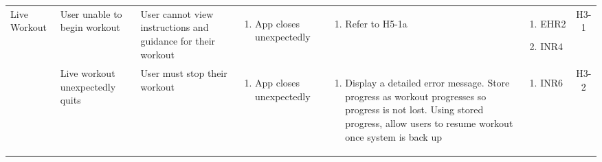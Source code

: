 \documentclass{article}
\begin{document}
\begin{longtable}{|p{1.7cm}|p{1.7cm} p{2.4cm} p{2.4cm} p{3.5cm} p{1.6cm} c|}
        \hline
        Live Workout & User unable to begin workout & User cannot view instructions and guidance for their workout & \vspace*{-\baselineskip}\begin{enumerate}[label=\alph*., left=0pt, nosep]\item App closes unexpectedly \end{enumerate} & \vspace*{-\baselineskip}\begin{enumerate}[label=\alph*., left=0pt, nosep]\item Refer to H5-1a \end{enumerate}& \vspace*{-\baselineskip}\begin{enumerate}[label=\alph*., left=0pt, nosep] \item EHR2 \item INR4 \end{enumerate} & H3-1\\
        \cline{2-7}
        & Live workout unexpectedly quits & User must stop their workout & \vspace*{-\baselineskip}\begin{enumerate}[label=\alph*., left=0pt, nosep]\item App closes unexpectedly \end{enumerate} & \vspace*{-\baselineskip}\begin{enumerate}[label=\alph*., left=0pt, nosep]\item Display a detailed error message. Store progress as workout progresses so progress is not lost. Using stored progress, allow users to resume workout once system is back up \end{enumerate} & \vspace*{-\baselineskip}\begin{enumerate}[label=\alph*., left=0pt, nosep] \item INR6 \end{enumerate} & H3-2\\
        \hline

\end{longtable}
\end{document}
